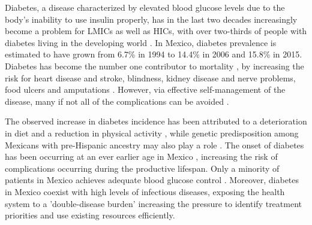 \documentclass[12pt,english]{article}
\begin{document}
Diabetes, a disease characterized by elevated blood glucose levels due to the body's inability to use insulin properly, has in the last two decades increasingly become a problem for \acp{LMIC} as well as \acp{HIC}, with over two-thirds of people with diabetes living in the developing world \parencite{InternationalDiabetesFederation2015}. In Mexico, diabetes prevalence is estimated to have grown from 6.7\% in 1994 to 14.4\% in 2006 \parencite{Barquera2013} and 15.8\% in 2015. Diabetes has become the number one contributor to mortality \parencite{InternationalDiabetesFederation2015}, by increasing the risk for heart disease and stroke, blindness, kidney disease and nerve problems, food ulcers and amputations \parencite{Reynoso-Noveron2011}. However, via effective self-management of the disease, many if not all of the complications can be avoided \parencite{Lim2011, Gregg2012}.

The observed increase in diabetes incidence has been attributed to a deterioration in diet and a reduction in physical activity \parencite{Barquera2008b,Basu2013}, while genetic predisposition among Mexicans with pre-Hispanic ancestry may also play a role \parencite{Williams2013}. The onset of diabetes has been occurring at an ever earlier age in Mexico \parencite{Bello-Chavolla2017a}, increasing the risk of complications occurring during the productive lifespan. Only a minority of patients in Mexico achieves adequate blood glucose control \parencite{Barquera2013}. Moreover, diabetes in Mexico coexist with high levels of infectious diseases, exposing the health system to a 'double-disease burden' increasing the pressure to identify treatment priorities and use existing resources efficiently\parencite{Gutierrez-delgado2009}.
\end{document}
